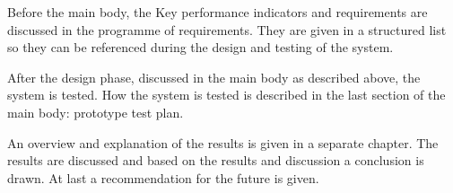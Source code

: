 Before the main body, the Key performance indicators and requirements are discussed in the programme of requirements.
They are given in a structured list so they can be referenced during the design and testing of the system.

After the design phase, discussed in the main body as described above, the system is tested.
How the system is tested is described in the last section of the main body: prototype test plan.

An overview and explanation of the results is given in a separate chapter.
The results are discussed and based on the results and discussion a conclusion is drawn.
At last a recommendation for the future is given.
